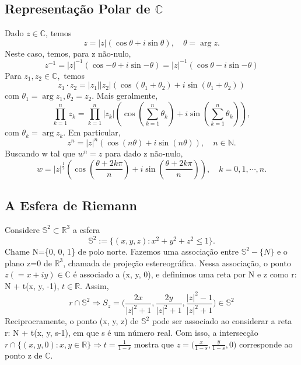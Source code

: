 \documentclass{article}
\begin{document}
  \subsection{Representa\c c\~ao Polar de $\mathbb{C}$}
  Dado $z\in \mathbb{C}$, temos 
  $$
  z = |z|(\cos{\theta} + i\sin{\theta}), \quad \theta = \arg z.
  $$
  Neste caso, temos, para z n\~ao-nulo,
  $$
  z ^{-1} = |z|^{-1}(\cos{-\theta} + i\sin{-\theta}) = |z|^{-1}(\cos{\theta}-i\sin{-\theta})
  $$
  Para $z _{1}, z _{2}\in \mathbb{C},$ temos
  $$
  z _{1}\cdot z _{2} = |z _{1}||z _{2}|(\cos(\theta _{1} + \theta _{2}) + i\sin(\theta _{1} + \theta _{2}))
  $$
com $\theta _{1} = \arg z _{1}, \theta _{2} = z _{2}.$ Mais geralmente, 
  $$
  \prod_{k=1}^{n}z _{k} = \prod_{k=1}^{n} |z _{k}|(\cos(\sum_{k=1}^{n}\theta _{k}) + i\sin(\sum_{k=1}^{n}\theta _{k})),
  $$
com $\theta _{k} = \arg z _{k}$. Em particular, 
  $$
  z ^{n} = |z|^{n}(\cos(n\theta)+i\sin(n \theta)), \quad n\in \mathbb{N}.
  $$
  Buscando w tal que $w ^{n} = z$ para dado z n\~ao-nulo,
  $$
  w = |z|^{\frac{1}{2}}(\cos(\frac{\theta + 2k\pi}{n}) + i\sin(\frac{\theta + 2k\pi}{n})), \quad k = 0, 1, \cdots, n.
  $$

  \subsection{A Esfera de Riemann}
  Considere $\mathbb{S}^{2}\subset{\mathbb{R}^{3}}$ a esfera 
  $$
  \mathbb{S}^{2}:= \{(x, y, z): x ^{2} + y ^{2} + z ^{2}\leq{1}\}.
  $$
  Chame N=\{0, 0, 1\} de polo norte. Fazemos uma associa\c c\~ao entre $\mathbb{S}^{2}-\{N\}$ e o plano z=0 de $\mathbb{R}^{3}$,
chamada de proje\c c\~ao estereogr\'afica. Nessa associa\c c\~ao, o ponto $z(=x + iy)\in\mathbb{C}$ \'e associado a (x, y, 0), e
definimos uma reta por N e z como r: N + t(x, y, -1), $t\in \mathbb{R}$. Assim,
  $$
  r\cap{\mathbb{S}^{2}} \Rightarrow S _{z} = \biggl(\frac{2x}{|z|^{2}+1}, \frac{2y}{|z|^{2}+1}, \frac{|z|^{2}-1}{|z|^{2}+1}\biggr)\in \mathbb{S}^{2}
  $$
  Reciprocramente, o ponto (x, y, z) de $\mathbb{S}^{2}$ pode ser associado ao considerar a reta r: N + t(x, y, s-1), em que
s \'e um n\'umero real. Com isso, a intersec\c c\~ao $r\cap \{(x, y, 0): x, y \in \mathbb{R}\}\Rightarrow t=\frac{1}{1-s}$ mostra que 
$z = \biggl(\frac{x}{1-s}, \frac{y}{1-s}, 0\biggr)$ corresponde ao ponto z de $\mathbb{C}$.
  
\end{document}

